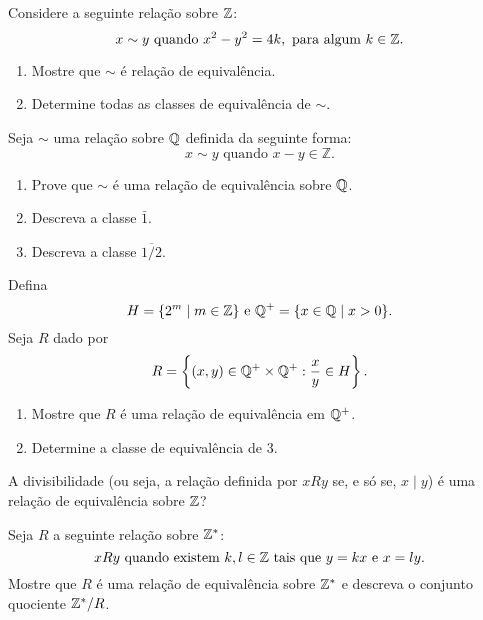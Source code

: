 \documentclass[12pt]{exam}
\begin{document}
\vspace{.3cm}

\questao{} Considere a seguinte rela\c{c}\~ao sobre $\mathbb{Z}$:
\[
    x \sim y \mbox{ quando }  x^2 - y^2 = 4k, \mbox{ para algum } k \in \mathbb{Z}.
\]
\begin{enumerate}[label={\alph*})]
    \item Mostre que $\sim$ {\'e} rela{\c c}{\~a}o de equival{\^e}ncia.
    \item Determine todas as classes de equival\^encia de $\sim$.
\end{enumerate}
\vspace{.3cm}

\questao{} Seja $\sim$ uma rela{\c c}{\~a}o sobre $\mathbb{Q}$ definida da seguinte forma:
\[
    x \sim y \mbox{ quando } x - y \in \mathbb{Z}.
\]
\begin{enumerate}[label={\alph*})]
    \item Prove que $\sim$ {\'e} uma rela{\c c}{\~a}o de equival{\^e}ncia sobre $\mathbb{Q}$.
    \item Descreva a classe $\bar{1}$.
    \item Descreva a classe $\overline{1/2}$.
\end{enumerate}

\vspace{.3cm}

\questao{} Defina
\[
    H = \{2^m \mid m \in \mathbb{Z}\} \mbox{ e } \mathbb{Q}^+ = \{x \in \mathbb{Q} \mid x > 0\}.
\]
Seja $R$ dado por
\[
    R = \left\{(x,y) \in \mathbb{Q}^+\times \mathbb{Q}^+ : \frac{x}{y} \in H\right\}.
\]
\begin{enumerate}[label={\alph*})]
    \item Mostre que $R$ \'e uma rela\c{c}\~ao de equival\^encia em $\mathbb{Q}^+$.
    \item Determine a classe de equival\^encia de $3$.
\end{enumerate}
\vspace{.3cm}

\questao{} A divisibilidade (ou seja, a rela{\c c}{\~a}o definida por $xRy$ se, e s{\'o}
se, $x \mid y$) {\'e} uma rela{\c c}{\~a}o de equival{\^e}ncia sobre $\mathbb{Z}$?

\vspace{.3cm}

\questao{} Seja $R$ a seguinte rela{\c c}{\~a}o sobre $\mathbb{Z}^*$:
\[
    x R y \mbox{ quando existem }  k, l \in \mathbb{Z} \mbox{ tais que } y = kx \mbox{ e } x = ly.
\]
Mostre que $R$ {\'e} uma rela{\c c}{\~a}o de equival{\^e}ncia sobre $\mathbb{Z}^*$ e
descreva o conjunto quociente $\mathbb{Z}^*/R$.
\end{document}
